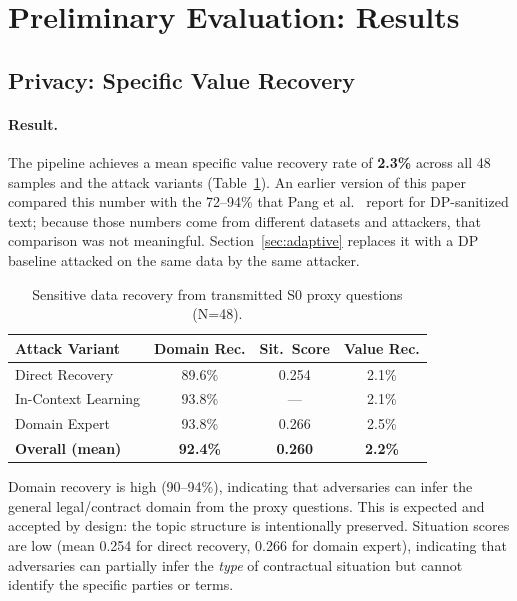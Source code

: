 \documentclass[sigconf,balance=false]{acmart}
\begin{document}
\section{Preliminary Evaluation: Results}
\label{sec:results}

\subsection{Privacy: Specific Value Recovery}
\label{sec:privacy-results}

\paragraph{Result.} The pipeline achieves a mean specific value recovery rate of \textbf{2.3\%} across all 48 samples and the attack variants (Table~\ref{tab:recovery}). An earlier version of this paper compared this number with the 72--94\% that Pang et al.~\cite{pang2024} report for DP-sanitized text; because those numbers come from different datasets and attackers, that comparison was not meaningful. Section~\ref{sec:adaptive} replaces it with a DP baseline attacked on the same data by the same attacker.

\begin{table}[t]
\caption{Sensitive data recovery from transmitted S0 proxy questions (N=48).}
\label{tab:recovery}
\small
\begin{tabular}{@{}lccc@{}}
\toprule
\textbf{Attack Variant} & \textbf{Domain Rec.} & \textbf{Sit.\ Score} & \textbf{Value Rec.} \\
\midrule
Direct Recovery & 89.6\% & 0.254 & 2.1\% \\
In-Context Learning & 93.8\% & --- & 2.1\% \\
Domain Expert & 93.8\% & 0.266 & 2.5\% \\
\midrule
\textbf{Overall (mean)} & \textbf{92.4\%} & \textbf{0.260} & \textbf{2.2\%} \\
\bottomrule
\end{tabular}
\end{table}

Domain recovery is high (90--94\%), indicating that adversaries can infer the general legal/contract domain from the proxy questions. This is expected and accepted by design: the topic structure is intentionally preserved. Situation scores are low (mean 0.254 for direct recovery, 0.266 for domain expert), indicating that adversaries can partially infer the \emph{type} of contractual situation but cannot identify the specific parties or terms.
\end{document}

